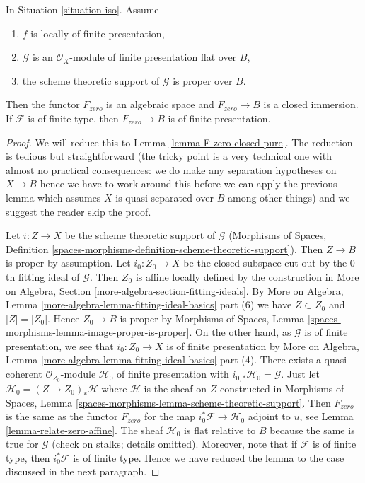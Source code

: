 \begin{lemma}
\label{lemma-F-zero-closed-proper}
In Situation \ref{situation-iso}. Assume
\begin{enumerate}
\item $f$ is locally of finite presentation,
\item $\mathcal{G}$ is an $\mathcal{O}_X$-module of finite presentation
flat over $B$,
\item the scheme theoretic support of $\mathcal{G}$ is proper over $B$.
\end{enumerate}
Then the functor $F_{zero}$ is an algebraic space and $F_{zero} \to B$
is a closed immersion. If $\mathcal{F}$ is of finite type, then
$F_{zero} \to B$ is of finite presentation.
\end{lemma}

\begin{proof}
We will reduce this to Lemma \ref{lemma-F-zero-closed-pure}.
The reduction is tedious but straightforward
(the tricky point is a very technical one with almost
no practical consequences: we do make any separation hypotheses on
$X \to B$ hence we have to work around this before we can apply
the previous lemma which assumes $X$ is quasi-separated over $B$
among other things) and we suggest the reader skip the proof.

\medskip\noindent
Let $i : Z \to X$ be the scheme theoretic support of $\mathcal{G}$
(Morphisms of Spaces, Definition
\ref{spaces-morphisms-definition-scheme-theoretic-support}).
Then $Z \to B$ is proper by assumption.
Let $i_0 : Z_0 \to X$ be the closed subspace cut out by the
$0$th fitting ideal of $\mathcal{G}$. Then $Z_0$ is
affine locally defined by the construction in
More on Algebra, Section \ref{more-algebra-section-fitting-ideals}.
By More on Algebra, Lemma
\ref{more-algebra-lemma-fitting-ideal-basics} part (6)
we have $Z \subset Z_0$ and $|Z| = |Z_0|$. Hence $Z_0 \to B$
is proper by 
Morphisms of Spaces, Lemma \ref{spaces-morphisms-lemma-image-proper-is-proper}.
On the other hand, as $\mathcal{G}$ is of finite presentation,
we see that $i_0 : Z_0 \to X$ is of finite presentation by
More on Algebra, Lemma
\ref{more-algebra-lemma-fitting-ideal-basics} part (4).
There exists a quasi-coherent $\mathcal{O}_{Z_0}$-module
$\mathcal{H}_0$ of finite presentation with
$i_{0, *}\mathcal{H}_0 = \mathcal{G}$.
Just let $\mathcal{H}_0 = (Z \to Z_0)_*\mathcal{H}$ where
$\mathcal{H}$ is the sheaf on $Z$ constructed in
Morphisms of Spaces, Lemma
\ref{spaces-morphisms-lemma-scheme-theoretic-support}.
Then $F_{zero}$ is the same as the functor $F_{zero}$
for the map $i_0^*\mathcal{F} \to \mathcal{H}_0$ adjoint to $u$, see
Lemma \ref{lemma-relate-zero-affine}.
The sheaf $\mathcal{H}_0$ is flat relative to $B$ because
the same is true for $\mathcal{G}$ (check on stalks; details omitted).
Moreover, note that if $\mathcal{F}$ is of finite type,
then $i_0^*\mathcal{F}$ is of finite type.
Hence we have reduced the lemma to the case
discussed in the next paragraph.


\end{proof}
